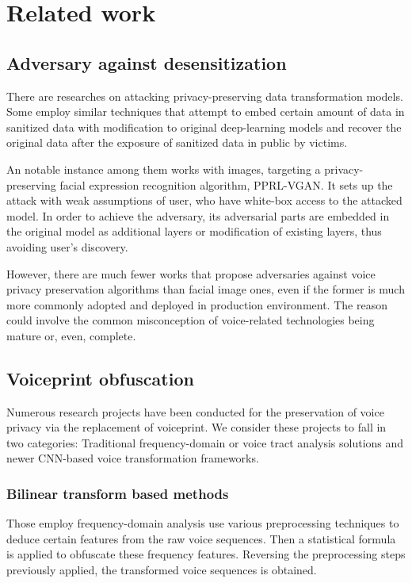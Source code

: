 \documentclass[journal]{IEEEtran} %
\begin{document}
\section{Related work}
\label{seg:related}

\subsection{Adversary against desensitization}

There are researches on attacking privacy-preserving data transformation models. Some employ similar techniques that attempt to embed certain amount of data in sanitized data with modification to original deep-learning models and recover the original data after the exposure of sanitized data in public by victims. 

An notable instance among them works with images, targeting a privacy-preserving facial expression recognition algorithm, PPRL-VGAN. It sets up the attack with weak assumptions of user, who have white-box access to the attacked model. In order to achieve the adversary, its adversarial parts are embedded in the original model as additional layers or modification of existing layers, thus avoiding user's discovery.\cite{pprl-vgan,subvert}

However, there are much fewer works that propose adversaries against voice privacy preservation algorithms than facial image ones, even if the former is much more commonly adopted and deployed in production environment. The reason could involve the common misconception of voice-related technologies being mature or, even, complete.

\subsection{Voiceprint obfuscation}

Numerous research projects have been conducted for the preservation of voice privacy via the replacement of voiceprint. We consider these projects to fall in two categories: Traditional frequency-domain or voice tract analysis solutions and newer CNN-based voice transformation frameworks.

\subsubsection{Bilinear transform based methods}

Those employ frequency-domain analysis use various preprocessing techniques to deduce certain features from the raw voice sequences. Then a statistical formula is applied to obfuscate these frequency features. Reversing the preprocessing steps previously applied, the transformed voice sequences is obtained.\cite{a9, a10, a11}
\end{document}
